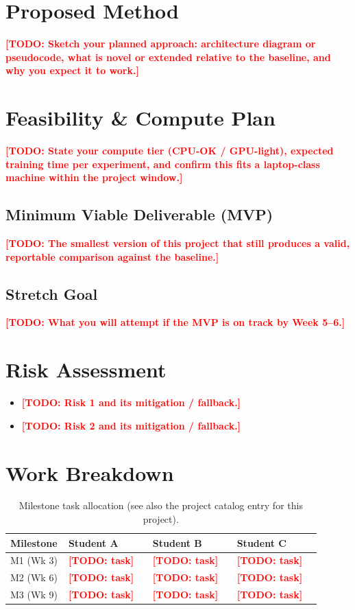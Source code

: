 \documentclass[11pt]{article}
\newcommand{\todo}[1]{\textcolor{red}{\textbf{[TODO: #1]}}}
\begin{document}
\section{Proposed Method}
\label{sec:method}
\todo{Sketch your planned approach: architecture diagram or pseudocode, what is novel
or extended relative to the baseline, and why you expect it to work.}

\section{Feasibility \& Compute Plan}
\label{sec:feasibility}
\todo{State your compute tier (CPU-OK / GPU-light), expected training time per
experiment, and confirm this fits a laptop-class machine within the project window.}

\subsection{Minimum Viable Deliverable (MVP)}
\todo{The smallest version of this project that still produces a valid, reportable
comparison against the baseline.}

\subsection{Stretch Goal}
\todo{What you will attempt if the MVP is on track by Week 5--6.}

\section{Risk Assessment}
\label{sec:risk}
\begin{itemize}[leftmargin=*]
  \item \todo{Risk 1 and its mitigation / fallback.}
  \item \todo{Risk 2 and its mitigation / fallback.}
\end{itemize}

\section{Work Breakdown}
\label{sec:workbreakdown}
\begin{table}[h]
\centering
\caption{Milestone task allocation (see also the project catalog entry for this
project).}
\label{tab:tasks}
\begin{tabular}{@{}p{0.12\linewidth}p{0.26\linewidth}p{0.26\linewidth}p{0.26\linewidth}@{}}
\toprule
\textbf{Milestone} & \textbf{Student A} & \textbf{Student B} & \textbf{Student C} \\
\midrule
M1 (Wk 3) & \todo{task} & \todo{task} & \todo{task} \\
M2 (Wk 6) & \todo{task} & \todo{task} & \todo{task} \\
M3 (Wk 9) & \todo{task} & \todo{task} & \todo{task} \\
\bottomrule
\end{tabular}
\end{table}



\end{document}
